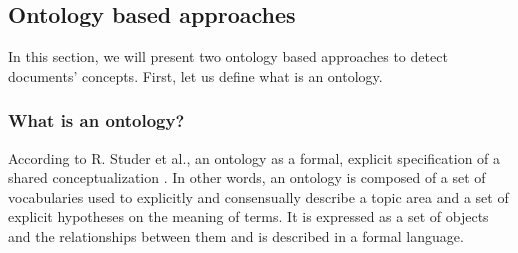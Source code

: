 \subsection{Ontology based approaches} 
In this section, we will present two ontology based approaches to detect documents' concepts. First, let us define what is an ontology.
\subsubsection{What is an ontology?}
According to R. Studer et al., an ontology as a formal, explicit specification of a shared conceptualization \cite{a:def}. In other words, an ontology is composed of a set of vocabularies used to explicitly and
consensually describe a topic area and a set of explicit hypotheses on the meaning of
terms. It is expressed as a set of objects and the relationships between them and is
described in a formal language.\\ 
